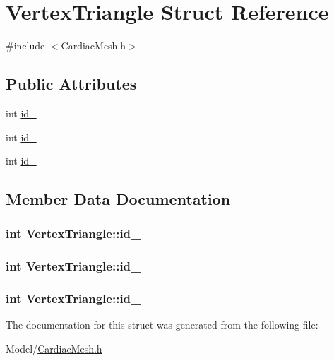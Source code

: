 \hypertarget{struct_vertex_triangle}{\section{Vertex\+Triangle Struct Reference}
\label{struct_vertex_triangle}
}


{\ttfamily \#include $<$Cardiac\+Mesh.\+h$>$}

\subsection*{Public Attributes}
\begin{DoxyCompactItemize}
\item 
int \hyperlink{struct_vertex_triangle_a02c83b5bd5c880951ae988a330f66898}{id\+\_}
\item 
int \hyperlink{struct_vertex_triangle_a181c3625c4cae44d95a068dd3005b553}{id\+\_}
\item 
int \hyperlink{struct_vertex_triangle_a4790abaf5729d50fe5ef8b18e3c12654}{id\+\_}
\end{DoxyCompactItemize}


\subsection{Member Data Documentation}
\hypertarget{struct_vertex_triangle_a02c83b5bd5c880951ae988a330f66898}{
\subsubsection[{id\+\_\+1}]{\setlength{\rightskip}{0pt plus 5cm}int Vertex\+Triangle\+::id\+\_}}\label{struct_vertex_triangle_a02c83b5bd5c880951ae988a330f66898}
\hypertarget{struct_vertex_triangle_a181c3625c4cae44d95a068dd3005b553}{
\subsubsection[{id\+\_\+2}]{\setlength{\rightskip}{0pt plus 5cm}int Vertex\+Triangle\+::id\+\_}}\label{struct_vertex_triangle_a181c3625c4cae44d95a068dd3005b553}
\hypertarget{struct_vertex_triangle_a4790abaf5729d50fe5ef8b18e3c12654}{
\subsubsection[{id\+\_\+3}]{\setlength{\rightskip}{0pt plus 5cm}int Vertex\+Triangle\+::id\+\_}}\label{struct_vertex_triangle_a4790abaf5729d50fe5ef8b18e3c12654}


The documentation for this struct was generated from the following file\+:\begin{DoxyCompactItemize}
\item 
Model/\hyperlink{_cardiac_mesh_8h}{Cardiac\+Mesh.\+h}\end{DoxyCompactItemize}
